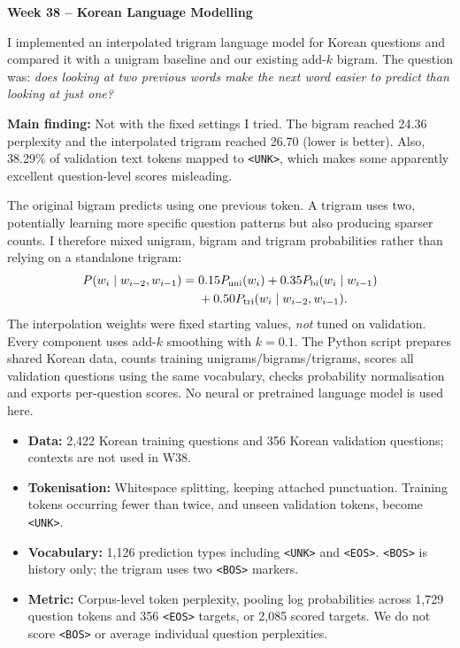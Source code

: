 \documentclass[10pt,a4paper]{article}
\newcommand{\sectionline}[1]{\vspace{2pt}{\large\bfseries #1}\par\vspace{1pt}}
\begin{document}
\fontsize{9.7}{12.1}\selectfont
\begin{center}
{\Large\bfseries Week 38 -- Korean Language Modelling}\par
\end{center}
\vspace{-8pt}

\sectionline{Quick summary}
I implemented an interpolated trigram language model for Korean questions and compared it with a unigram baseline and our existing add-$k$ bigram. The question was: \emph{does looking at two previous words make the next word easier to predict than looking at just one?}

\textbf{Main finding:} Not with the fixed settings I tried. The bigram reached 24.36 perplexity and the interpolated trigram reached 26.70 (lower is better). Also, 38.29\% of validation text tokens mapped to \texttt{<UNK>}, which makes some apparently excellent question-level scores misleading.

\sectionline{1. What I implemented}
The original bigram predicts using one previous token. A trigram uses two, potentially learning more specific question patterns but also producing sparser counts. I therefore mixed unigram, bigram and trigram probabilities rather than relying on a standalone trigram:
\[
\begin{aligned}
P(w_i\mid w_{i-2},w_{i-1})
={}&0.15P_{\rm uni}(w_i)+0.35P_{\rm bi}(w_i\mid w_{i-1})\\
&+0.50P_{\rm tri}(w_i\mid w_{i-2},w_{i-1}).
\end{aligned}
\]
The interpolation weights were fixed starting values, \emph{not} tuned on validation. Every component uses add-$k$ smoothing with $k=0.1$. The Python script prepares shared Korean data, counts training unigrams/bigrams/trigrams, scores all validation questions using the same vocabulary, checks probability normalisation and exports per-question scores. No neural or pretrained language model is used here.

\sectionline{2. Data and evaluation}
\begin{itemize}
\item \textbf{Data:} 2,422 Korean training questions and 356 Korean validation questions; contexts are not used in W38.
\item \textbf{Tokenisation:} Whitespace splitting, keeping attached punctuation. Training tokens occurring fewer than twice, and unseen validation tokens, become \texttt{<UNK>}.
\item \textbf{Vocabulary:} 1,126 prediction types including \texttt{<UNK>} and \texttt{<EOS>}. \texttt{<BOS>} is history only; the trigram uses two \texttt{<BOS>} markers.
\item \textbf{Metric:} Corpus-level token perplexity, pooling log probabilities across 1,729 question tokens and 356 \texttt{<EOS>} targets, or 2,085 scored targets. We do not score \texttt{<BOS>} or average individual question perplexities.
\end{itemize}
\end{document}
